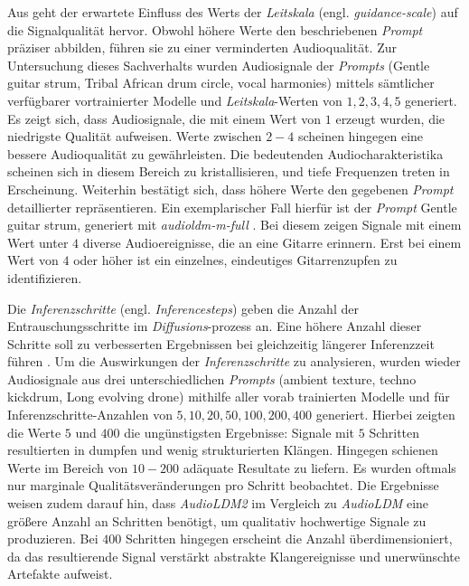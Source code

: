 \documentclass[
  a4paper,  %
  twoside,  %
  bibliography=totoc,
  headsepline,
  cleardoublepage=empty,
  parskip=half,
  draft=false
]{scrbook}
\begin{document}
Aus \cite{noauthor_huggingface-audioldm_nodate, noauthor_huggingface-audioldm2_nodate} geht der erwartete Einfluss des Werts der \emph{Leitskala} (engl. \emph{guidance-scale}) auf die Signalqualität hervor. Obwohl höhere Werte den beschriebenen \emph{Prompt} präziser abbilden, führen sie zu einer verminderten Audioqualität. Zur Untersuchung dieses Sachverhalts wurden Audiosignale der \emph{Prompts} (\glqq Gentle guitar strum, Tribal African drum circle, vocal harmonies\grqq) mittels sämtlicher verfügbarer vortrainierter Modelle und \emph{Leitskala}-Werten von $1,2,3,4,5$ generiert. Es zeigt sich, dass Audiosignale, die mit einem Wert von $1$ erzeugt wurden, die niedrigste Qualität aufweisen. Werte zwischen $2-4$ scheinen hingegen eine bessere Audioqualität zu gewährleisten. Die bedeutenden Audiocharakteristika scheinen sich in diesem Bereich zu kristallisieren, und tiefe Frequenzen treten in Erscheinung. Weiterhin bestätigt sich, dass höhere Werte den gegebenen \emph{Prompt} detaillierter repräsentieren. Ein exemplarischer Fall hierfür ist der \emph{Prompt} \glqq Gentle guitar strum\grqq, generiert mit \emph{audioldm-m-full} \cite{noauthor_cvsspaudioldm-m-full_nodate}. Bei diesem zeigen Signale mit einem Wert unter $4$ diverse Audioereignisse, die an eine Gitarre erinnern. Erst bei einem Wert von $4$ oder höher ist ein einzelnes, eindeutiges Gitarrenzupfen zu identifizieren.

Die \emph{Inferenzschritte} (engl. \emph{Inferencesteps}) geben die Anzahl der Entrauschungsschritte im \emph{Diffusions}-prozess an. Eine höhere Anzahl dieser Schritte soll zu verbesserten Ergebnissen bei gleichzeitig längerer Inferenzzeit führen \cite{noauthor_huggingface-audioldm2_nodate, noauthor_huggingface-audioldm_nodate}. Um die Auswirkungen der \emph{Inferenzschritte} zu analysieren, wurden wieder Audiosignale aus drei unterschiedlichen \emph{Prompts} (\glqq ambient texture\grqq, \glqq techno kickdrum\grqq, \glqq Long evolving drone\grqq) mithilfe aller vorab trainierten Modelle und für Inferenzschritte-Anzahlen von $5,10,20,50,100,200,400$ generiert. Hierbei zeigten die Werte $5$ und $400$ die ungünstigsten Ergebnisse: Signale mit $5$ Schritten resultierten in dumpfen und wenig strukturierten Klängen. Hingegen schienen Werte im Bereich von $10-200$ adäquate Resultate zu liefern. Es wurden oftmals nur marginale Qualitätsveränderungen pro Schritt beobachtet. Die Ergebnisse weisen zudem darauf hin, dass \emph{AudioLDM2} im Vergleich zu \emph{AudioLDM} eine größere Anzahl an Schritten benötigt, um qualitativ hochwertige Signale zu produzieren. Bei $400$ Schritten hingegen erscheint die Anzahl überdimensioniert, da das resultierende Signal verstärkt abstrakte Klangereignisse und unerwünschte Artefakte aufweist.
\end{document}
